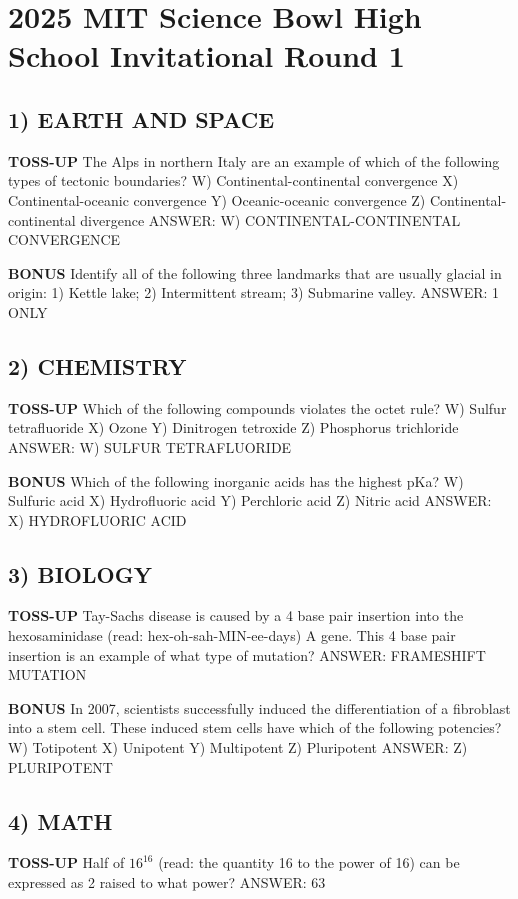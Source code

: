 \documentclass{article}
\begin{document}
\section*{2025 MIT Science Bowl High School Invitational Round 1}

\subsection*{1) EARTH AND SPACE}
\textbf{TOSS-UP}
The Alps in northern Italy are an example of which of the following types of tectonic boundaries?
W) Continental-continental convergence
X) Continental-oceanic convergence
Y) Oceanic-oceanic convergence
Z) Continental-continental divergence
ANSWER: W) CONTINENTAL-CONTINENTAL CONVERGENCE

\textbf{BONUS}
Identify all of the following three landmarks that are usually glacial in origin: 1) Kettle lake; 2) Intermittent stream; 3) Submarine valley.
ANSWER: 1 ONLY

\subsection*{2) CHEMISTRY}
\textbf{TOSS-UP}
Which of the following compounds violates the octet rule?
W) Sulfur tetrafluoride
X) Ozone
Y) Dinitrogen tetroxide
Z) Phosphorus trichloride
ANSWER: W) SULFUR TETRAFLUORIDE

\textbf{BONUS}
Which of the following inorganic acids has the highest pKa?
W) Sulfuric acid
X) Hydrofluoric acid
Y) Perchloric acid
Z) Nitric acid
ANSWER: X) HYDROFLUORIC ACID

\subsection*{3) BIOLOGY}
\textbf{TOSS-UP}
Tay-Sachs disease is caused by a 4 base pair insertion into the hexosaminidase (read: hex-oh-sah-MIN-ee-days) A gene. This 4 base pair insertion is an example of what type of mutation?
ANSWER: FRAMESHIFT MUTATION

\textbf{BONUS}
In 2007, scientists successfully induced the differentiation of a fibroblast into a stem cell. These induced stem cells have which of the following potencies?
W) Totipotent
X) Unipotent
Y) Multipotent
Z) Pluripotent
ANSWER: Z) PLURIPOTENT

\subsection*{4) MATH}
\textbf{TOSS-UP}
Half of $16^{16}$ (read: the quantity 16 to the power of 16) can be expressed as 2 raised to what power?
ANSWER: 63
\end{document}
